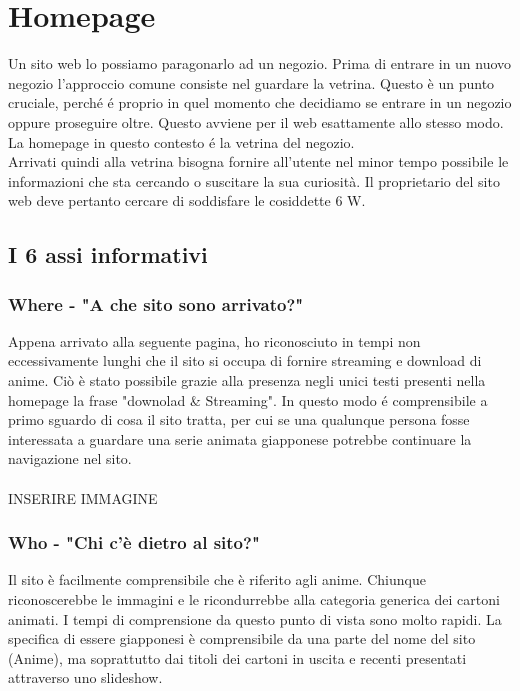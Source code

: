 \section{Homepage} \label{Homepage}
Un sito web lo possiamo paragonarlo ad un negozio. Prima di entrare in un nuovo negozio l’approccio comune consiste nel guardare la vetrina. Questo è un punto cruciale, perché é proprio in quel momento che decidiamo se entrare in un negozio oppure proseguire oltre. Questo avviene per il web esattamente allo stesso modo. La homepage in questo contesto é la vetrina del negozio. \\
Arrivati quindi alla vetrina bisogna fornire all'utente nel minor tempo possibile le informazioni che sta cercando o  suscitare la sua curiosità. Il proprietario del sito web deve pertanto cercare di soddisfare le cosiddette 6 W. 

\subsection{I 6 assi informativi} \label{Assi informativi}

\subsubsection{Where - "A che sito sono arrivato?"} \label{HWhere}
Appena arrivato alla seguente pagina, ho riconosciuto in tempi non eccessivamente lunghi che il sito si occupa di fornire streaming e download di anime. Ciò è stato possibile grazie alla presenza negli unici testi presenti nella homepage la frase "downolad \& Streaming". In questo modo é comprensibile a primo sguardo di cosa il sito tratta, per cui se una qualunque persona fosse interessata a guardare una serie animata giapponese potrebbe continuare la navigazione nel sito.
\\
\\
INSERIRE IMMAGINE

\subsubsection{Who - "Chi c'è dietro al sito?"} \label{HWho}
Il sito è facilmente comprensibile che è riferito agli anime. Chiunque riconoscerebbe le immagini e le ricondurrebbe alla categoria generica dei cartoni animati. I tempi di comprensione da questo punto di vista sono molto rapidi. La specifica di essere giapponesi è comprensibile da una parte del nome del sito (Anime), ma soprattutto dai titoli dei cartoni in uscita e recenti presentati attraverso uno slideshow.

